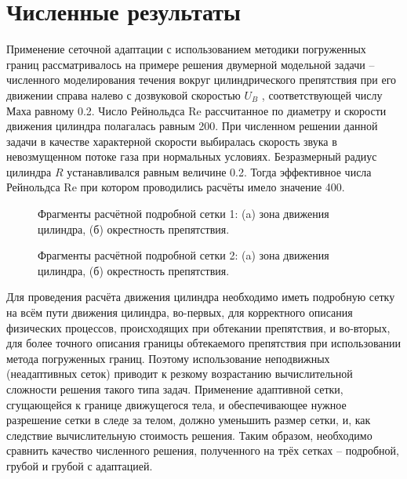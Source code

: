 \chapter{Численные результаты} \label{ch:ch3}
Применение сеточной адаптации с использованием методики погруженных границ рассматривалось на примере решения двумерной модельной задачи – численного моделирования течения вокруг цилиндрического препятствия при его движении справа налево с дозвуковой скоростью $U_B$ , соответствующей числу Маха равному 0.2. Число Рейнольдса Re рассчитанное по диаметру и скорости движения цилиндра полагалась равным 200. При численном решении данной задачи в качестве характерной скорости выбиралась скорость звука в невозмущенном потоке газа при нормальных условиях. Безразмерный радиус цилиндра $R$  устанавливался равным величине 0.2. Тогда эффективное числа Рейнольдса  Re при котором проводились расчёты имело значение 400.
\begin{figure}
	{\centering
		\hfill
	}
	\caption[Фрагменты расчётной подробной сетки 1]{Фрагменты расчётной подробной сетки 1: (a) зона движения цилиндра, (б) окрестность препятствия.}
	\label{fig:setka1}
\end{figure}
\begin{figure}
	{\centering
		\hfill
	}
	\caption[Фрагменты расчётной подробной сетки 2]{Фрагменты расчётной подробной сетки 2: (a) зона движения цилиндра, (б) окрестность препятствия.}
		\label{fig:setka2}
\end{figure}

Для проведения расчёта движения цилиндра необходимо иметь подробную сетку на всём пути движения цилиндра, во-первых, для корректного описания физических процессов, происходящих при обтекании препятствия, и во-вторых, для более точного описания границы обтекаемого препятствия при использовании метода погруженных границ. Поэтому использование неподвижных (неадаптивных сеток) приводит к резкому возрастанию вычислительной сложности решения такого типа задач. Применение адаптивной сетки, сгущающейся к границе движущегося тела, и обеспечивающее нужное разрешение сетки в следе за телом, должно уменьшить размер сетки, и, как следствие вычислительную стоимость решения. Таким образом, необходимо сравнить качество численного решения, полученного на трёх сетках – подробной, грубой и грубой с адаптацией.

